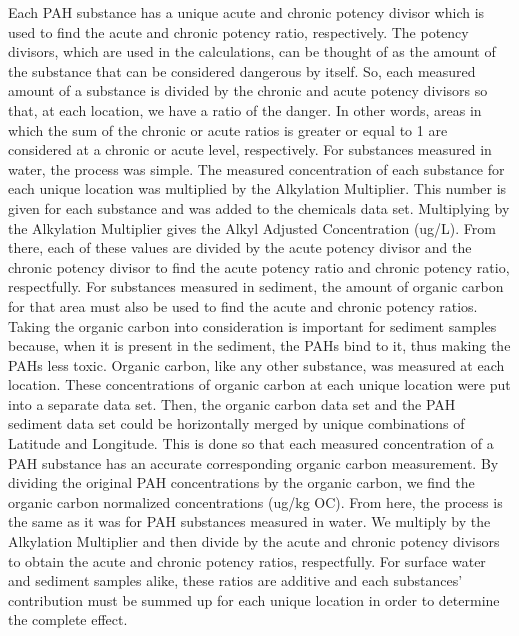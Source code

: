 \documentclass[11pt]{article}
\begin{document}
Each PAH substance has a unique acute and chronic potency divisor which is used to find the acute and chronic potency ratio, respectively.  The potency divisors, which are used in the calculations, can be thought of as the amount of the substance that can be considered dangerous by itself. So, each measured amount of a substance is divided by the chronic and acute potency divisors so that, at each location, we have a ratio of the danger.  In other words, areas in which the sum of the chronic or acute ratios is greater or equal to 1 are considered at a chronic or acute level, respectively.
For substances measured in water, the process was simple.  The measured concentration of each substance for each unique location was multiplied by the Alkylation Multiplier.  This number is given for each substance and was added to the chemicals data set.  Multiplying by the Alkylation Multiplier gives the Alkyl Adjusted Concentration (ug/L).  From there, each of these values are divided by the acute potency divisor and the chronic potency divisor to find the acute potency ratio and chronic potency ratio, respectfully.  For substances measured in sediment, the amount of organic carbon for that area must also be used to find the acute and chronic potency ratios. Taking the organic carbon into consideration is important for sediment samples because, when it is present in the sediment, the PAHs bind to it, thus making the PAHs less toxic. Organic carbon, like any other substance, was measured at each location.  These concentrations of organic carbon at each unique location were put into a separate data set.  Then, the organic carbon data set and the PAH sediment data set could be horizontally merged by unique combinations of Latitude and Longitude.  This is done so that each measured concentration of a PAH substance has an accurate corresponding organic carbon measurement.  By dividing the original PAH concentrations by the organic carbon, we find the organic carbon normalized concentrations (ug/kg OC).  From here, the process is the same as it was for PAH substances measured in water.  We multiply by the Alkylation Multiplier and then divide by the acute and chronic potency divisors to obtain the acute and chronic potency ratios, respectfully.   For surface water and sediment samples alike, these ratios are additive and each substances' contribution must be summed up for each unique location in order to determine the complete effect. 
\end{document}
